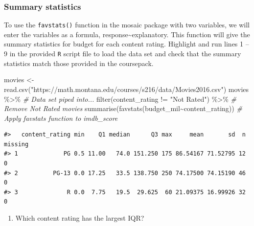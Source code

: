 \documentclass[
]{report}
\newenvironment{Shaded}{\begin{snugshade}}{\end{snugshade}}
\newcommand{\CommentTok}[1]{\textcolor[rgb]{0.56,0.35,0.01}{\textit{#1}}}
\newcommand{\FunctionTok}[1]{\textcolor[rgb]{0.00,0.00,0.00}{#1}}
\newcommand{\NormalTok}[1]{#1}
\newcommand{\OtherTok}[1]{\textcolor[rgb]{0.56,0.35,0.01}{#1}}
\newcommand{\SpecialCharTok}[1]{\textcolor[rgb]{0.00,0.00,0.00}{#1}}
\newcommand{\StringTok}[1]{\textcolor[rgb]{0.31,0.60,0.02}{#1}}
\providecommand{\tightlist}{%
  \setlength{\itemsep}{0pt}\setlength{\parskip}{0pt}}
\begin{document}
\newpage

\hypertarget{summary-statistics}{%
\subsubsection*{Summary statistics}\label{summary-statistics}}

To use the \texttt{favstats()} function in the mosaic package with two variables, we will enter the variables as a formula, response\textasciitilde explanatory. This function will give the summary statistics for budget for each content rating. Highlight and run lines 1 -- 9 in the provided \texttt{R} script file to load the data set and check that the summary statistics match those provided in the coursepack.

\begin{Shaded}
\begin{Highlighting}[]
\NormalTok{movies }\OtherTok{\textless{}{-}} \FunctionTok{read.csv}\NormalTok{(}\StringTok{"https://math.montana.edu/courses/s216/data/Movies2016.csv"}\NormalTok{)}
\NormalTok{movies }\SpecialCharTok{\%\textgreater{}\%} \CommentTok{\# Data set piped into...}
  \FunctionTok{filter}\NormalTok{(content\_rating }\SpecialCharTok{!=} \StringTok{"Not Rated"}\NormalTok{) }\SpecialCharTok{\%\textgreater{}\%} \CommentTok{\# Remove Not Rated movies}
  \FunctionTok{summarise}\NormalTok{(}\FunctionTok{favstats}\NormalTok{(budget\_mil}\SpecialCharTok{\textasciitilde{}}\NormalTok{content\_rating)) }\CommentTok{\# Apply favstats function to imdb\_score}
\end{Highlighting}
\end{Shaded}

\begin{verbatim}
#>   content_rating min    Q1 median      Q3 max     mean       sd  n missing
#> 1             PG 0.5 11.00   74.0 151.250 175 86.54167 71.52795 12       0
#> 2          PG-13 0.0 17.25   33.5 138.750 250 74.17500 74.15190 46       0
#> 3              R 0.0  7.75   19.5  29.625  60 21.09375 16.99926 32       0
\end{verbatim}

\begin{enumerate}
\def\labelenumi{\arabic{enumi}.}
\tightlist
\item
  Which content rating has the largest IQR?
\end{enumerate}

\vspace{0.8in}
\end{document}
